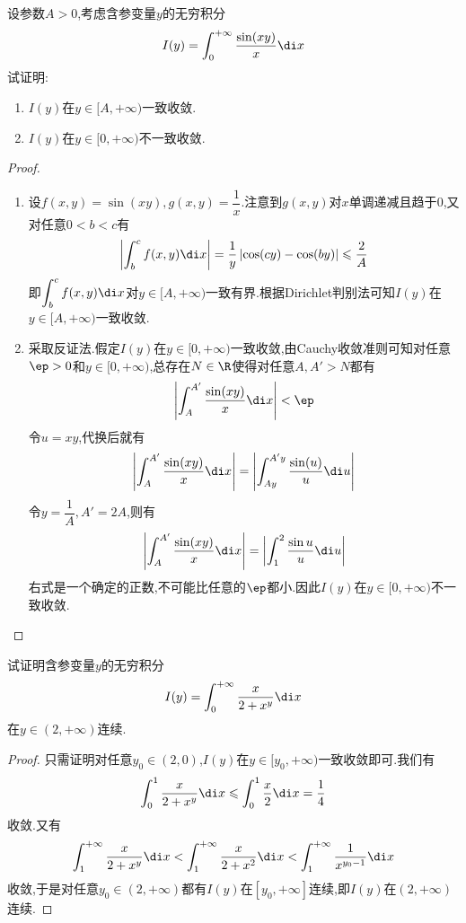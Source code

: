 \documentclass{ctexart}
\begin{document}
\begin{problem}[L.13.3]
    设参数$A>0$,考虑含参变量$y$的无穷积分
    \[I(y)=\int_0^{+\infty}\dfrac{\sin(xy)}{x}\di x\]
    试证明:
    \begin{enumerate}[label=\tbf{(\arabic*)},topsep=0pt,parsep=0pt,itemsep=0pt,partopsep=0pt]
        \item $I(y)$在$y\in[A,+\infty)$一致收敛.
        \item $I(y)$在$y\in[0,+\infty)$不一致收敛.
    \end{enumerate}
\end{problem}
\begin{proof}
    \begin{enumerate}[label=\tbf{(\arabic*)},topsep=0pt,parsep=0pt,itemsep=0pt,partopsep=0pt]
        \item 设$f(x,y)=\sin(xy),g(x,y)=\dfrac1x$.注意到$g(x,y)$对$x$单调递减且趋于$0$,又对任意$0<b<c$有
            \[\left|\int_b^cf(x,y)\di x\right|=\dfrac1y\left|\cos(cy)-\cos(by)\right|\leqslant\dfrac{2}{A}\]
            即$\displaystyle\int_b^cf(x,y)\di x$对$y\in[A,+\infty)$一致有界.根据Dirichlet判别法可知$I(y)$在$y\in[A,+\infty)$一致收敛.
        \item 采取反证法.假定$I(y)$在$y\in[0,+\infty)$一致收敛,由Cauchy收敛准则可知对任意$\ep>0$和$y\in[0,+\infty)$,总存在$N\in\R$使得对任意$A,A'>N$都有
            \[\left|\int_A^{A'}\dfrac{\sin(xy)}{x}\di x\right|<\ep\]
            令$u=xy$,代换后就有
            \[\left|\int_A^{A'}\dfrac{\sin(xy)}{x}\di x\right|
            =\left|\int_{Ay}^{A'y}\dfrac{\sin(u)}{u}\di u\right|\]
            令$y=\dfrac{1}{A},A'=2A$,则有
            \[\left|\int_A^{A'}\dfrac{\sin(xy)}{x}\di x\right|=\left|\int_1^2\dfrac{\sin u}{u}\di u\right|\]
            右式是一个确定的正数,不可能比任意的$\ep$都小.因此$I(y)$在$y\in[0,+\infty)$不一致收敛.
    \end{enumerate}
\end{proof}
\begin{problem}[L.13.4]
    试证明含参变量$y$的无穷积分
    \[I(y)=\int_0^{+\infty}\dfrac{x}{2+x^y}\di x\]
    在$y\in(2,+\infty)$连续.
\end{problem}
\begin{proof}
    只需证明对任意$y_0\in(2,0)$,$I(y)$在$y\in[y_0,+\infty)$一致收敛即可.我们有
    \[\int_0^1\dfrac{x}{2+x^y}\di x\leqslant\int_0^1\dfrac{x}{2}\di x=\dfrac14\]
    收敛.又有
    \[\int_1^{+\infty}\dfrac{x}{2+x^y}\di x<\int_1^{+\infty}\dfrac{x}{2+x^2}\di x<\int_1^{+\infty}\dfrac{1}{x^{y_0-1}}\di x\]
    收敛,于是对任意$y_0\in(2,+\infty)$都有$I(y)$在$[y_0,+\infty]$连续,即$I(y)$在$(2,+\infty)$连续.
\end{proof}
\end{document}
